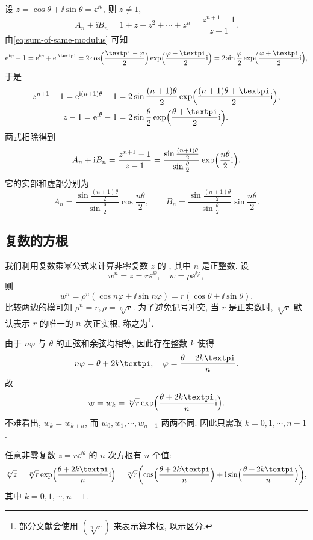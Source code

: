 \begin{solution}
  设 $z=\cos\theta+\ii\sin\theta=\ee^{\ii\theta}$, 则 $z\neq 1$,
  \[
    A_n+\ii B_n=1+z+z^2+\cdots+z^n=\frac{z^{n+1}-1}{z-1}.
  \]
  由\eqref{eq:sum-of-same-modulus} 可知
  \[
     \ee^{\ii\varphi}-1
    =\ee^{\ii\varphi}+\ee^{\ii\cpi}
    =2\cos\Bigl(\frac{\cpi-\varphi}2\Bigr)\exp\Bigl(\frac{\varphi+\cpi}2\ii\Bigr)
    =2\sin\frac\varphi2\exp\Bigl(\frac{\varphi+\cpi}2\ii\Bigr),
  \]
  于是
  \begin{align*}
     z^{n+1}-1
    =\ee^{\ii(n+1)\theta}-1&
    =2\sin{\frac{(n+1)\theta}2}\exp\Bigl(\frac{(n+1)\theta+\cpi}2\ii\Bigr),\\
     z-1
    =\ee^{\ii\theta}-1&
    =2\sin{\frac\theta2}\exp\Bigl(\frac{\theta+\cpi}2\ii\Bigr).
  \end{align*}
  两式相除得到
  \[
     A_n+\mathrm{i} B_n
    =\frac{z^{n+1}-1}{z-1}
    =\frac{\sin\frac{(n+1)\theta}2}{\sin\frac\theta2}\exp\Bigl(\frac{n\theta}2\mathrm{i}\Bigr).
  \]
  它的实部和虚部分别为
  \[
     A_n
    =\frac{\sin\frac{(n+1)\theta}2}{\sin\frac\theta2}\cos\frac{n\theta}2,\qquad
    B_n
     =\frac{\sin\frac{(n+1)\theta}2}{\sin\frac\theta2}\sin\frac{n\theta}2.
  \]
\end{solution}


\subsection{复数的方根}

我们利用复数乘幂公式来计算非零复数 $z$ 的 , 其中 $n$ 是正整数.
设
\[
  w^n=z=r\ee^{\ii\theta},\quad 
  w=\rho \ee^{\ii\varphi},
\]
则
\[
  w^n=\rho^n(\cos{n\varphi}+\ii\sin{n\varphi})
     =r(\cos\theta+\ii\sin\theta).
\]
比较两边的模可知 $\rho^n=r,\rho=\sqrt[n]r$.
为了避免记号冲突, 当 $r$ 是正实数时, $\sqrt[n]r$ 默认表示 $r$ 的唯一的 $n$ 次正实根, 称之为\footnote{%
  部分文献会使用 $(\sqrt[n]r)$ 来表示算术根, 以示区分.%
}.

由于 $n\varphi$ 与 $\theta$ 的正弦和余弦均相等, 因此存在整数 $k$ 使得
\[
  n\varphi=\theta+2k\cpi,\quad \varphi=\frac{\theta+2k\cpi}n.
\]
故
\[
  w=w_k=\sqrt[n]r\exp\Bigl(\frac{\theta+2k\cpi}n\ii\Bigr).
\]
不难看出, $w_k=w_{k+n}$, 而 $w_0,w_1,\cdots,w_{n-1}$ 两两不同.
因此只需取 $k=0,1,\cdots,n-1$.
\begin{theorem}
  \label{thm:root}
  任意非零复数 $z=r\ee^{\ii\theta}$ 的 $n$ 次方根有 $n$ 个值:
  \[
     \sqrt[n]z
    =\sqrt[n]r\exp\Bigl(\frac{\theta+2k\cpi}n\ii\Bigr)
    =\sqrt[n]r\biggl(
      \cos\Bigl(\frac{\theta+2k\cpi}n\Bigr)
      +\ii\sin\Bigl(\frac{\theta+2k\cpi}n\Bigr)
    \biggr),
  \]
  其中 $k=0,1,\cdots,n-1$.
\end{theorem}

